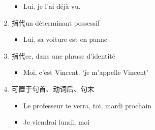 \documentclass[UTF8]{report}
\begin{document}
\begin{enumerate}
\begin{enumerate}
\begin{enumerate}
\begin{itemize}
                \item Lui, je l’ai déjà vu.
            \end{itemize}
            \item 指代un déterminant possessif
            \begin{itemize}
                \item Lui, sa voiture est en panne
            \end{itemize}
            \item 指代ce, dans une phrase d’identité 
            \begin{itemize}
                \item Moi, c’est Vincent. ‘je m’appelle Vincent’
            \end{itemize}
            \item 可置于句首、动词后、句末
            \begin{itemize}
                \item Le professeur te verra, toi, mardi prochain
                \item Je viendrai lundi, moi
            \end{itemize}
        \end{enumerate}
    \end{enumerate}
\end{enumerate}
\end{document}
